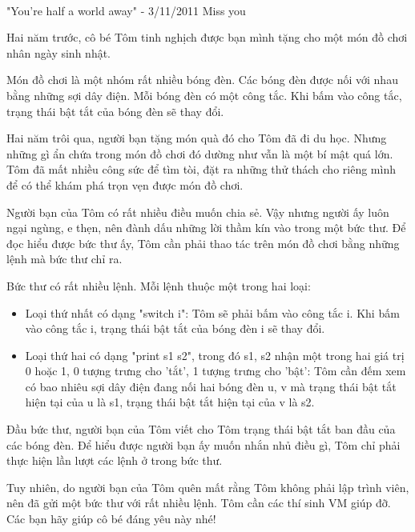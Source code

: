 

 

"You're half a world away" - 3/11/2011 Miss you

Hai năm trước, cô bé Tôm tinh nghịch được bạn mình tặng cho một món đồ chơi nhân ngày sinh nhật.

Món đồ chơi là một nhóm rất nhiều bóng đèn. Các bóng đèn được nối với nhau bằng những sợi dây điện. Mỗi bóng đèn có một công tắc. Khi bấm vào công tắc, trạng thái bật tắt của bóng đèn sẽ thay đổi.

Hai năm trôi qua, người bạn tặng món quà đó cho Tôm đã đi du học. Nhưng những gì ẩn chứa trong món đồ chơi đó dường như vẫn là một bí mật quá lớn. Tôm đã mất nhiều công sức để tìm tòi, đặt ra những thử thách cho riêng mình để có thể khám phá trọn vẹn được món đồ chơi.

Người bạn của Tôm có rất nhiều điều muốn chia sẻ. Vậy nhưng người ấy luôn ngại ngùng, e thẹn, nên đành dấu những lời thầm kín vào trong một bức thư. Để đọc hiểu được bức thư ấy, Tôm cần phải thao tác trên món đồ chơi bằng những lệnh mà bức thư chỉ ra.

Bức thư có rất nhiều lệnh. Mỗi lệnh thuộc một trong hai loại:
\begin{itemize}
	\item Loại thứ nhất có dạng "switch i": Tôm sẽ phải bấm vào công tắc i. Khi bấm vào công tắc i, trạng thái bật tắt của bóng đèn i sẽ thay đổi.
	\item Loại thứ hai có dạng "print s1 s2", trong đó s1, s2 nhận một trong hai giá trị 0 hoặc 1, 0 tượng trưng cho 'tắt', 1 tượng trưng cho 'bật': Tôm cần đếm xem có bao nhiêu sợi dây điện đang nối hai bóng đèn u, v mà trạng thái bật tắt hiện tại của u là s1, trạng thái bật tắt hiện tại của v là s2.
\end{itemize}

Đầu bức thư, người bạn của Tôm viết cho Tôm trạng thái bật tắt ban đầu của các bóng đèn. Để hiểu được người bạn ấy muốn nhắn nhủ điều gì, Tôm chỉ phải thực hiện lần lượt các lệnh ở trong bức thư.

Tuy nhiên, do người bạn của Tôm quên mất rằng Tôm không phải lập trình viên, nên đã gửi một bức thư với rất nhiều lệnh. Tôm cần các thí sinh VM giúp đỡ. Các bạn hãy giúp cô bé đáng yêu này nhé!

